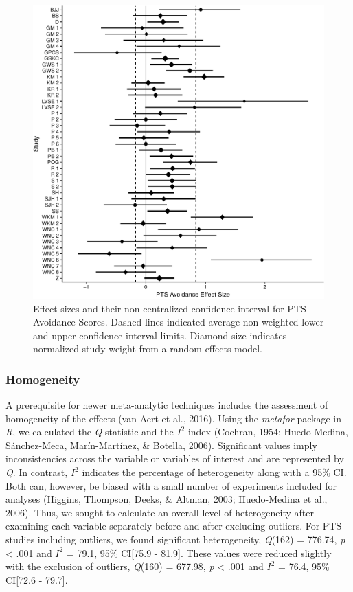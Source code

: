 \documentclass[man, mask]{apa6}
\theoremstyle{definition}
\theoremstyle{definition}
\theoremstyle{definition}
\theoremstyle{remark}
\begin{document}
\begin{figure}[htbp]
\centering
\includegraphics{meta_markdown_files/figure-latex/ptspicavoid-1.pdf}
\caption{\label{fig:ptspicavoid}Effect sizes and their non-centralized
confidence interval for PTS Avoidance Scores. Dashed lines indicated
average non-weighted lower and upper confidence interval limits. Diamond
size indicates normalized study weight from a random effects model.}
\end{figure}

\subsubsection{Homogeneity}\label{homogeneity}

A prerequisite for newer meta-analytic techniques includes the
assessment of homogeneity of the effects (van Aert et al., 2016). Using
the \emph{metafor} package in \emph{R}, we calculated the
\emph{Q}-statistic and the \(I^2\) index (Cochran, 1954; Huedo-Medina,
Sánchez-Meca, Marín-Martínez, \& Botella, 2006). Significant values
imply inconsistencies across the variable or variables of interest and
are represented by \emph{Q}. In contrast, \(I^2\) indicates the
percentage of heterogeneity along with a 95\% CI. Both can, however, be
biased with a small number of experiments included for analyses
(Higgins, Thompson, Deeks, \& Altman, 2003; Huedo-Medina et al., 2006).
Thus, we sought to calculate an overall level of heterogeneity after
examining each variable separately before and after excluding outliers.
For PTS studies including outliers, we found significant heterogeneity,
\emph{Q}(162) = 776.74, \emph{p} \textless{} .001 and \(I^2\) = 79.1,
95\% CI{[}75.9 - 81.9{]}. These values were reduced slightly with the
exclusion of outliers, \emph{Q}(160) = 677.98, \emph{p} \textless{} .001
and \(I^2\) = 76.4, 95\% CI{[}72.6 - 79.7{]}.
\end{document}
